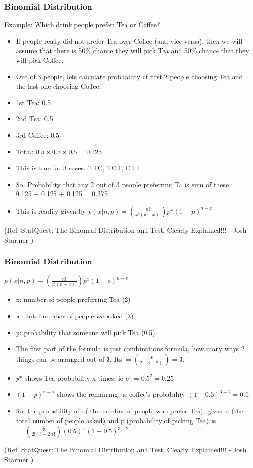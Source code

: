 \begin{frame}[fragile]\frametitle{Binomial Distribution}
Example: Which drink people prefer: Tea or Coffee?


	\begin{itemize}
	\item If people really did not prefer Tea over Coffee (and vice versa), then we will assume that there is 50\% chance they will pick Tea and 50\% chance that they will pick Coffee.
	\item Out of 3 people, lets calculate probability of first 2 people choosing Tea and the last one choosing Coffee.
	\item 1st Tea: 0.5
	\item 2nd Tea: 0.5
	\item 3rd Coffee: 0.5
	\item Total: $0.5 \times 0.5 \times 0.5 = 0.125$ 
	\item This is true for 3 cases: TTC, TCT, CTT
	\item So, Probability that any 2 out of 3 people preferring Ta is sum of these = 0.125 + 0.125 + 0.125 = 0.375
	\item This is readily given by $p(x|n,p) = (\frac{n!}{x!(n-x)!})p^x(1-p)^{n-x}$
	\end{itemize}

 
\tiny{(Ref: StatQuest: The Binomial Distribution and Test, Clearly Explained!!! - Josh Starmer )}
\end{frame}

\begin{frame}[fragile]\frametitle{Binomial Distribution}
$p(x|n,p) = (\frac{n!}{x!(n-x)!})p^x(1-p)^{n-x}$


	\begin{itemize}
	\item x: number of people preferring Tea (2)
	\item n : total number of people we asked (3)
	\item p: probability that someone will pick Tea (0.5)
	\item The first part of the formula is just combinations formula, how many ways 2 things can be arranged out of 3. Its $= (\frac{3!}{2!(3-2)!})=3$.
	\item $p^x$ shows Tea probability x times, ie $p^x = 0.5^2 = 0.25$
	\item $(1-p)^{n-x}$ shows the remaining, ie coffee's probability $(1-0.5)^{3-2} = 0.5$
	\item So, the probability of x( the number of people who prefer Tea), given n (the total number of people asked) and p (probability of picking Tea) is $= (\frac{3!}{2!(3-2)!})(0.5)^x(1-0.5)^{3-2}$
	\end{itemize}

 
\tiny{(Ref: StatQuest: The Binomial Distribution and Test, Clearly Explained!!! - Josh Starmer )}
\end{frame}


